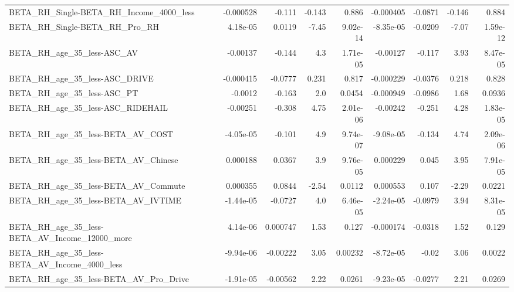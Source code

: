 \begin{tabular}{lrrrrrrrr}
BETA\_RH\_Single-BETA\_RH\_Income\_4000\_less            &   -0.000528 &       -0.111 &    -0.143 &    0.886 &  -0.000405 &     -0.0871 &       -0.146 &         0.884 \\
BETA\_RH\_Single-BETA\_RH\_Pro\_RH                      &    4.18e-05 &       0.0119 &     -7.45 & 9.02e-14 &  -8.35e-05 &     -0.0209 &        -7.07 &      1.59e-12 \\
BETA\_RH\_age\_35\_less-ASC\_AV                         &    -0.00137 &       -0.144 &       4.3 & 1.71e-05 &   -0.00127 &      -0.117 &         3.93 &      8.47e-05 \\
BETA\_RH\_age\_35\_less-ASC\_DRIVE                      &   -0.000415 &      -0.0777 &     0.231 &    0.817 &  -0.000229 &     -0.0376 &        0.218 &         0.828 \\
BETA\_RH\_age\_35\_less-ASC\_PT                         &     -0.0012 &       -0.163 &       2.0 &   0.0454 &  -0.000949 &     -0.0986 &         1.68 &        0.0936 \\
BETA\_RH\_age\_35\_less-ASC\_RIDEHAIL                   &    -0.00251 &       -0.308 &      4.75 & 2.01e-06 &   -0.00242 &      -0.251 &         4.28 &      1.83e-05 \\
BETA\_RH\_age\_35\_less-BETA\_AV\_COST                   &   -4.05e-05 &       -0.101 &       4.9 & 9.74e-07 &  -9.08e-05 &      -0.134 &         4.74 &      2.09e-06 \\
BETA\_RH\_age\_35\_less-BETA\_AV\_Chinese                &    0.000188 &       0.0367 &       3.9 & 9.76e-05 &   0.000229 &       0.045 &         3.95 &      7.91e-05 \\
BETA\_RH\_age\_35\_less-BETA\_AV\_Commute                &    0.000355 &       0.0844 &     -2.54 &   0.0112 &   0.000553 &       0.107 &        -2.29 &        0.0221 \\
BETA\_RH\_age\_35\_less-BETA\_AV\_IVTIME                 &   -1.44e-05 &      -0.0727 &       4.0 & 6.46e-05 &  -2.24e-05 &     -0.0979 &         3.94 &      8.31e-05 \\
BETA\_RH\_age\_35\_less-BETA\_AV\_Income\_12000\_more      &    4.14e-06 &     0.000747 &      1.53 &    0.127 &  -0.000174 &     -0.0318 &         1.52 &         0.129 \\
BETA\_RH\_age\_35\_less-BETA\_AV\_Income\_4000\_less       &   -9.94e-06 &     -0.00222 &      3.05 &  0.00232 &  -8.72e-05 &       -0.02 &         3.06 &        0.0022 \\
BETA\_RH\_age\_35\_less-BETA\_AV\_Pro\_Drive              &   -1.91e-05 &     -0.00562 &      2.22 &   0.0261 &  -9.23e-05 &     -0.0277 &         2.21 &        0.0269 \\

\end{tabular}
